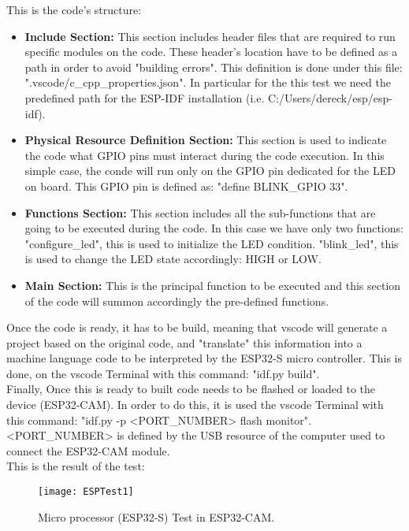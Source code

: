 This is the code's structure:
\begin{itemize}
	\item\textbf{Include Section: }This section includes header files that are required to run specific modules on the code. These header's location have to be defined as a path in order to avoid "building errors". This definition is done under this file: ".vscode/c\_cpp\_properties.json". In particular for the this test we need the predefined path for the ESP-IDF installation (i.e. C:/Users/dereck/esp/esp-idf).
	\item\textbf{Physical Resource Definition Section: }This section is used to indicate the code what GPIO pins must interact during the code execution. In this simple case, the conde will run only on the GPIO pin dedicated for the LED on board. This GPIO pin is defined as: "define BLINK\_GPIO 33".
	\item\textbf{Functions Section: }This section includes all the sub-functions that are going to be executed during the code. In this case we have only two functions: "configure\_led", this is used to initialize the LED condition. "blink\_led", this is used to change the LED state accordingly: HIGH or LOW. 
	\item\textbf{Main Section: }This is the principal function to be executed and this section of the code will summon accordingly the pre-defined functions. 
\end{itemize}

Once the code is ready, it has to be build, meaning that \ac{vscode} will generate a project based on the original code, and "translate" this information into a machine language code to be interpreted by the ESP32-S micro controller. This is done, on the \ac{vscode} Terminal with this command: "idf.py build". \\

Finally, Once this is ready to built code needs to be flashed or loaded to the device (ESP32-CAM). In order to do this, it is used the  \ac{vscode} Terminal with this command: "idf.py -p <PORT\_NUMBER> flash monitor". <PORT\_NUMBER> is defined by the USB resource of the computer used to connect the ESP32-CAM module. \\

This is the result of the test: 
\begin{figure}  [H]
	\begin{center}
		\texttt{[image: ESPTest1]}
		\caption{Micro processor (ESP32-S) Test in ESP32-CAM.} 
		\label{fig:Micro processor (ESP32-S) Test in ESP32-CAM.}
	\end{center}
\end{figure}	

